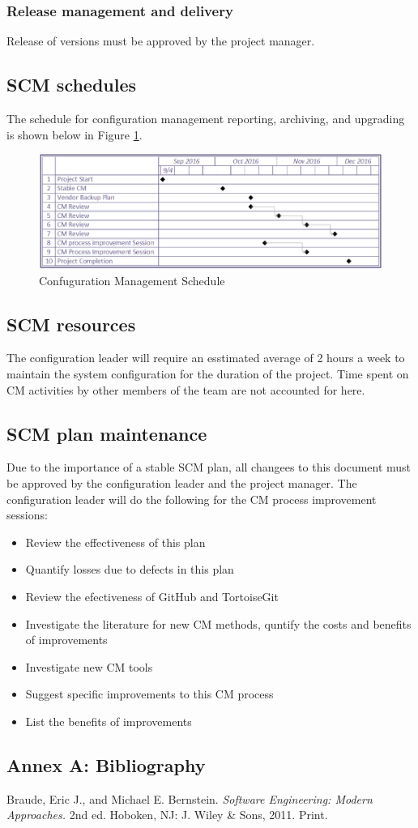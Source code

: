 \documentclass{scrartcl}
\begin{document}
\subsubsection{Release management and delivery}
Release of versions must be approved by the project manager.

\subsection{SCM schedules}
The schedule for configuration management reporting, archiving, and upgrading is shown below in Figure \ref{fig:schedule}.
\begin{figure}[H]
\centering
\includegraphics[scale=0.65]{CMSchedule}
 \caption{Confuguration Management Schedule}
 \label{fig:schedule}
\end{figure}

\subsection{SCM resources}
The configuration leader will require an esstimated average of 2 hours a week to maintain the system configuration for the duration of the project.  Time spent on CM activities by other members of the team are not accounted for here.

\subsection{SCM plan maintenance}
Due to the importance of a stable SCM plan, all changees to this document must be approved by the configuration leader and the project manager.
\newline \newline
The configuration leader will do the following for the CM process improvement sessions:
\begin{itemize}
\item Review the effectiveness of this plan
\item Quantify losses due to defects in this plan
\item Review the efectiveness of GitHub and TortoiseGit
\item Investigate the literature for new CM methods, quntify the costs and benefits of improvements
\item Investigate new CM tools
\item Suggest specific improvements to this CM process
\item List the benefits of improvements
\end{itemize}

\newpage
\setcounter{secnumdepth}{0} 
\subsection{Annex A: Bibliography}
Braude, Eric J., and Michael E. Bernstein. \textit{Software Engineering: Modern Approaches.} 2nd ed. Hoboken, NJ: J. Wiley \& Sons, 2011. Print.
\newline
\end{document}
